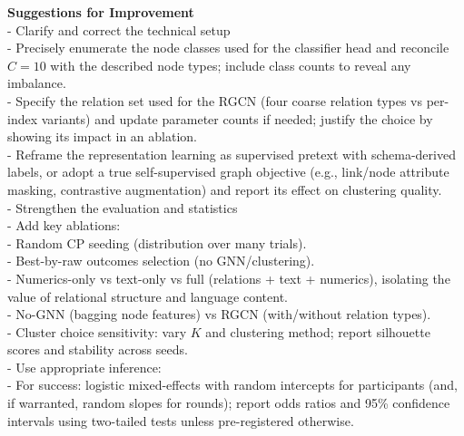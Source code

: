 \documentclass[letterpaper]{article} %
\begin{document}
\textbf{Suggestions for Improvement}\\
- Clarify and correct the technical setup\\
\hspace*{1em}- Precisely enumerate the node classes used for the classifier head and reconcile $C=10$ with the described node types; include class counts to reveal any imbalance.\\
\hspace*{1em}- Specify the relation set used for the RGCN (four coarse relation types vs per-index variants) and update parameter counts if needed; justify the choice by showing its impact in an ablation.\\
\hspace*{1em}- Reframe the representation learning as supervised pretext with schema-derived labels, or adopt a true self-supervised graph objective (e.g., link/node attribute masking, contrastive augmentation) and report its effect on clustering quality.\\[0.25em]
- Strengthen the evaluation and statistics\\
\hspace*{1em}- Add key ablations:\\
\hspace*{2em}- Random CP seeding (distribution over many trials).\\
\hspace*{2em}- Best-by-raw outcomes selection (no GNN/clustering).\\
\hspace*{2em}- Numerics-only vs text-only vs full (relations + text + numerics), isolating the value of relational structure and language content.\\
\hspace*{2em}- No-GNN (bagging node features) vs RGCN (with/without relation types).\\
\hspace*{2em}- Cluster choice sensitivity: vary $K$ and clustering method; report silhouette scores and stability across seeds.\\
\hspace*{1em}- Use appropriate inference:\\
\hspace*{2em}- For success: logistic mixed-effects with random intercepts for participants (and, if warranted, random slopes for rounds); report odds ratios and 95\% confidence intervals using two-tailed tests unless pre-registered otherwise.\\
\end{document}
